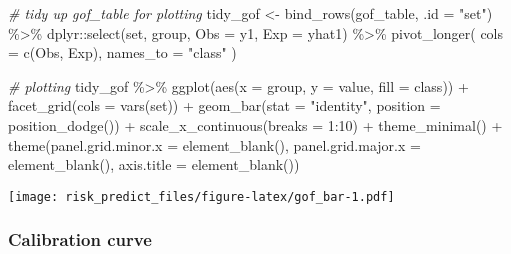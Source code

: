 \documentclass[
]{article}
\newenvironment{Shaded}{\begin{snugshade}}{\end{snugshade}}
\newcommand{\AttributeTok}[1]{\textcolor[rgb]{0.77,0.63,0.00}{#1}}
\newcommand{\CommentTok}[1]{\textcolor[rgb]{0.56,0.35,0.01}{\textit{#1}}}
\newcommand{\DecValTok}[1]{\textcolor[rgb]{0.00,0.00,0.81}{#1}}
\newcommand{\FunctionTok}[1]{\textcolor[rgb]{0.00,0.00,0.00}{#1}}
\newcommand{\NormalTok}[1]{#1}
\newcommand{\OtherTok}[1]{\textcolor[rgb]{0.56,0.35,0.01}{#1}}
\newcommand{\SpecialCharTok}[1]{\textcolor[rgb]{0.00,0.00,0.00}{#1}}
\newcommand{\StringTok}[1]{\textcolor[rgb]{0.31,0.60,0.02}{#1}}
\begin{document}
\begin{Shaded}
\begin{Highlighting}[]
\CommentTok{\# tidy up gof\_table for plotting}
\NormalTok{tidy\_gof }\OtherTok{\textless{}{-}} \FunctionTok{bind\_rows}\NormalTok{(gof\_table, }\AttributeTok{.id =} \StringTok{"set"}\NormalTok{) }\SpecialCharTok{\%\textgreater{}\%}
\NormalTok{  dplyr}\SpecialCharTok{::}\FunctionTok{select}\NormalTok{(set, group, }\AttributeTok{Obs =}\NormalTok{ y1, }\AttributeTok{Exp =}\NormalTok{ yhat1) }\SpecialCharTok{\%\textgreater{}\%} 
  \FunctionTok{pivot\_longer}\NormalTok{(}
    \AttributeTok{cols =} \FunctionTok{c}\NormalTok{(Obs, Exp),}
    \AttributeTok{names\_to =} \StringTok{"class"}
\NormalTok{  )}

\CommentTok{\# plotting}
\NormalTok{tidy\_gof }\SpecialCharTok{\%\textgreater{}\%} 
  \FunctionTok{ggplot}\NormalTok{(}\FunctionTok{aes}\NormalTok{(}\AttributeTok{x =}\NormalTok{ group, }\AttributeTok{y =}\NormalTok{ value, }\AttributeTok{fill =}\NormalTok{ class)) }\SpecialCharTok{+}
  \FunctionTok{facet\_grid}\NormalTok{(}\AttributeTok{cols =} \FunctionTok{vars}\NormalTok{(set)) }\SpecialCharTok{+}
  \FunctionTok{geom\_bar}\NormalTok{(}\AttributeTok{stat =} \StringTok{"identity"}\NormalTok{, }\AttributeTok{position =} \FunctionTok{position\_dodge}\NormalTok{()) }\SpecialCharTok{+}
  \FunctionTok{scale\_x\_continuous}\NormalTok{(}\AttributeTok{breaks =} \DecValTok{1}\SpecialCharTok{:}\DecValTok{10}\NormalTok{) }\SpecialCharTok{+}
  \FunctionTok{theme\_minimal}\NormalTok{() }\SpecialCharTok{+}
  \FunctionTok{theme}\NormalTok{(}\AttributeTok{panel.grid.minor.x =} \FunctionTok{element\_blank}\NormalTok{(),}
        \AttributeTok{panel.grid.major.x =} \FunctionTok{element\_blank}\NormalTok{(),}
        \AttributeTok{axis.title =} \FunctionTok{element\_blank}\NormalTok{())}
\end{Highlighting}
\end{Shaded}

\texttt{[image: risk\_predict\_files/figure-latex/gof\_bar-1.pdf]}

\hypertarget{calibration-curve}{%
\subsubsection{Calibration curve}\label{calibration-curve}}
\end{document}
